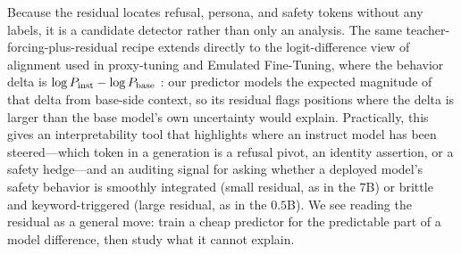 Because the residual locates refusal, persona, and safety tokens without any labels, it is a candidate detector rather than only an analysis. The same teacher-forcing-plus-residual recipe extends directly to the logit-difference view of alignment used in proxy-tuning and Emulated Fine-Tuning, where the behavior delta is $\log P_{\mathrm{inst}} - \log P_{\mathrm{base}}$ \citep{liu2024proxy,mitchell2023eft}: our predictor models the expected magnitude of that delta from base-side context, so its residual flags positions where the delta is larger than the base model's own uncertainty would explain. Practically, this gives an interpretability tool that highlights where an instruct model has been steered---which token in a generation is a refusal pivot, an identity assertion, or a safety hedge---and an auditing signal for asking whether a deployed model's safety behavior is smoothly integrated (small residual, as in the $7$B) or brittle and keyword-triggered (large residual, as in the $0.5$B). We see reading the residual as a general move: train a cheap predictor for the predictable part of a model difference, then study what it cannot explain.
